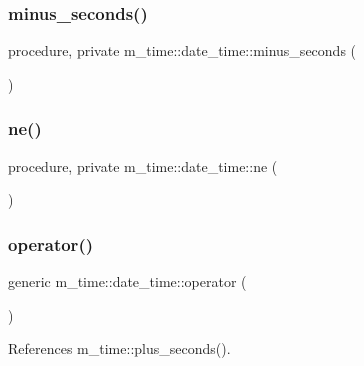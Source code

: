 \subsubsection{\texorpdfstring{minus\+\_\+seconds()}{minus\_seconds()}}
{\footnotesize\ttfamily procedure, private m\+\_\+time\+::date\+\_\+time\+::minus\+\_\+seconds (\begin{DoxyParamCaption}{ }\end{DoxyParamCaption})\hspace{0.3cm}{\ttfamily [private]}}

\mbox{\label{structm__time_1_1date__time_a4d9e08f2f8d3c8a9f3442297900891ec}} 
\subsubsection{\texorpdfstring{ne()}{ne()}}
{\footnotesize\ttfamily procedure, private m\+\_\+time\+::date\+\_\+time\+::ne (\begin{DoxyParamCaption}{ }\end{DoxyParamCaption})\hspace{0.3cm}{\ttfamily [private]}}

\mbox{\label{structm__time_1_1date__time_ad51508db1d161547062f40dcd91f4e4b}} 
\subsubsection{\texorpdfstring{operator()}{operator()}\hspace{0.1cm}{\footnotesize\ttfamily [1/9]}}
{\footnotesize\ttfamily generic m\+\_\+time\+::date\+\_\+time\+::operator (\begin{DoxyParamCaption}{ }\end{DoxyParamCaption})\hspace{0.3cm}{\ttfamily [private]}}



References m\+\_\+time\+::plus\+\_\+seconds().

